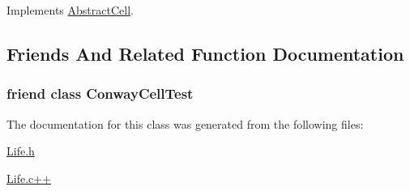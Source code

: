 Implements \hyperlink{classAbstractCell_a67008aedffea84aac7088ec84e8441cc}{Abstract\-Cell}.



\subsection{Friends And Related Function Documentation}
\hypertarget{classConwayCell_aaf9203db9ae10bf69d131c17aa7bf43c}{
\subsubsection[{Conway\-Cell\-Test}]{\setlength{\rightskip}{0pt plus 5cm}friend class Conway\-Cell\-Test\hspace{0.3cm}{\ttfamily [friend]}}}\label{classConwayCell_aaf9203db9ae10bf69d131c17aa7bf43c}


The documentation for this class was generated from the following files\-:\begin{DoxyCompactItemize}
\item 
\hyperlink{Life_8h}{Life.\-h}\item 
\hyperlink{Life_8c_09_09}{Life.\-c++}\end{DoxyCompactItemize}
